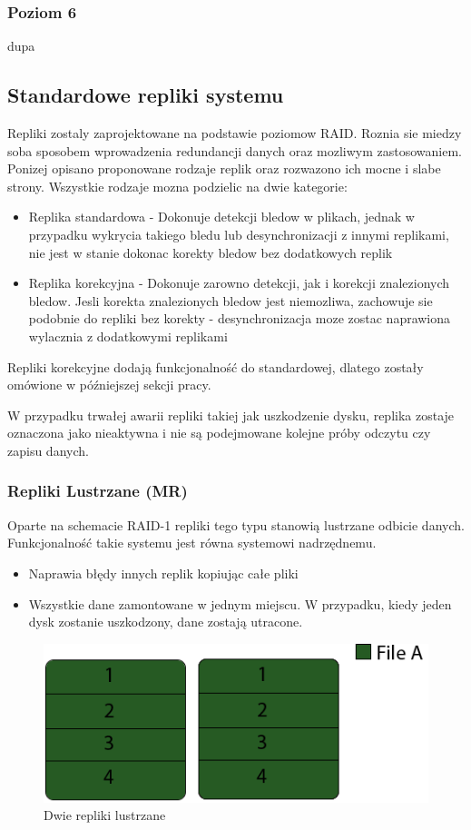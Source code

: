 \subsubsection{Poziom 6}
dupa

\newpage
\subsection{Standardowe repliki systemu}
Repliki zostaly zaprojektowane na podstawie poziomow RAID. Roznia sie miedzy soba sposobem wprowadzenia redundancji danych oraz mozliwym zastosowaniem. Ponizej opisano proponowane rodzaje replik oraz rozwazono ich mocne i slabe strony. Wszystkie rodzaje mozna podzielic na dwie kategorie:
\begin{itemize}
    \item Replika standardowa - Dokonuje detekcji bledow w plikach, jednak w przypadku wykrycia takiego bledu lub desynchronizacji z innymi replikami, nie jest w stanie dokonac korekty bledow bez dodatkowych replik
    \item Replika korekcyjna - Dokonuje zarowno detekcji, jak i korekcji znalezionych bledow. Jesli korekta znalezionych bledow jest niemozliwa, zachowuje sie podobnie do repliki bez korekty - desynchronizacja moze zostac naprawiona wylacznia z dodatkowymi replikami
\end{itemize}
Repliki korekcyjne dodają funkcjonalność do standardowej, dlatego zostały omówione w późniejszej sekcji pracy. 

W przypadku trwałej awarii repliki takiej jak uszkodzenie dysku, replika zostaje oznaczona jako nieaktywna i nie są podejmowane kolejne próby odczytu czy zapisu danych.
\subsubsection{Repliki Lustrzane (MR)}
Oparte na schemacie RAID-1 repliki tego typu stanowią lustrzane odbicie danych. Funkcjonalność takie systemu jest równa systemowi nadrzędnemu. 
\begin{itemize}
        \item Naprawia błędy innych replik kopiując całe pliki
        \item Wszystkie dane zamontowane w jednym miejscu. W przypadku, kiedy jeden dysk zostanie uszkodzony, dane zostają utracone.
\end{itemize}

\begin{figure}[h!]
        \centering
        \includegraphics{raid-1.png}
        \caption{Dwie repliki lustrzane}
        \label{fig:raid1}
\end{figure}

